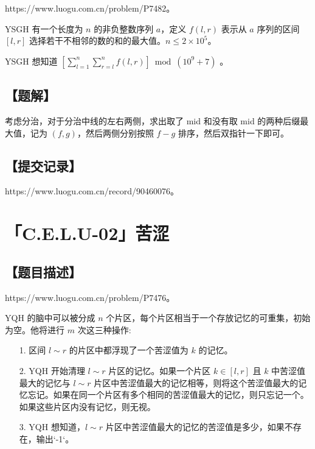 \documentclass[UTF8,12pt,a4paper]{ctexart}
\begin{document}
	https://www.luogu.com.cn/problem/P7482。
	
	YSGH 有一个长度为 $n$ 的非负整数序列 $a$，定义 $f(l, r)$ 表示从 $a$ 序列的区间 $[l, r]$ 选择若干不相邻的数的和的最大值。$n\le 2\times 10^5$。
	
	YSGH 想知道 $\displaystyle \left[ \sum_{l = 1}^{n} \sum_{r = l}^{n} f(l, r) \right] \bmod ({10}^9 + 7)$ 。
	
	\subsection*{【题解】}
	
	考虑分治，对于分治中线的左右两侧，求出取了 mid 和没有取 mid 的两种后缀最大值，记为 $(f,g)$，然后两侧分别按照 $f-g$ 排序，然后双指针一下即可。
	
	\subsection*{【提交记录】}
	
	https://www.luogu.com.cn/record/90460076。
	
	
	\section*{「C.E.L.U-02」苦涩}
	
	\subsection*{【题目描述】}
	
	https://www.luogu.com.cn/problem/P7476。
	
	YQH 的脑中可以被分成 $n$ 个片区，每个片区相当于一个存放记忆的可重集，初始为空。他将进行 $m$ 次这三种操作:
	
	\begin{itemize}
		\item [1.] 区间 $l\sim r$ 的片区中都浮现了一个苦涩值为 $k$ 的记忆。
		\item [2.] YQH 开始清理 $l\sim r$ 片区的记忆。如果一个片区 $k\in[l,r]$ 且 $k$ 中苦涩值最大的记忆与 $l\sim r$ 片区中苦涩值最大的记忆相等，则将这个苦涩值最大的记忆忘记。如果在同一个片区有多个相同的苦涩值最大的记忆，则只忘记一个。如果这些片区内没有记忆，则无视。
		\item [3.] YQH 想知道，$l\sim r$ 片区中苦涩值最大的记忆的苦涩值是多少，如果不存在，输出`-1`。
	\end{itemize}
\end{document}
